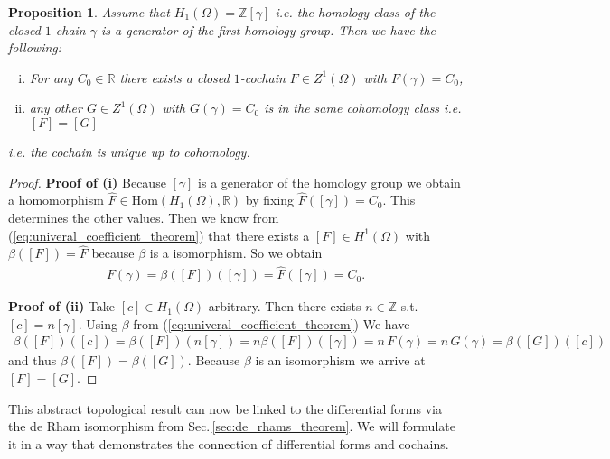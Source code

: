 \documentclass[12pt,a4paper]{article}
\numberwithin{equation}{subsection}
\numberwithin{lemma}{subsection}
\newtheorem{proposition}[lemma]{Proposition}
\theoremstyle{definition}
\newcommand{\integers}{\mathbb{Z}}
\newcommand{\real}{\mathbb{R}}
\begin{document}
\begin{proposition}\label{prop:uniqueness_cochain}
    Assume that $H_1(\Omega) = \integers [\gamma]$ i.e. the homology 
    class of the 
    closed $1$-chain $\gamma$ is a generator of the first homology group.
    Then we have the following:
    \begin{enumerate}[(i)]
        \item For any $C_0 \in \real$ there exists a closed $1$-cochain 
            $F \in Z^1(\Omega)$ with $F(\gamma) = C_0$,
        \item any other $G \in Z^1(\Omega)$ with $G(\gamma) = C_0$ 
            is in the same cohomology class i.e. $[F] = [G]$
    \end{enumerate}
    i.e. the cochain is unique up to cohomology.
\end{proposition}
\begin{proof}
    \textbf{Proof of (i)} %
    Because $[\gamma]$ is a generator of the homology group we  obtain a 
    homomorphism $\hat{F} \in \text{Hom}(H_1(\Omega),\real)$ by fixing
    $\hat{F}([\gamma]) = C_0$. This determines the other values.
    Then we know from (\ref{eq:univeral_coefficient_theorem}) that there exists
    a $[F] \in H^1(\Omega)$ with $\beta([F]) = \hat{F}$ because $\beta$ is a 
    isomorphism. So we obtain
    \begin{align*}
        F(\gamma) = \beta([F])([\gamma]) = \hat{F}([\gamma]) = C_0.
    \end{align*}

    \textbf{Proof of (ii)} %
    Take $[c] \in H_1(\Omega)$ arbitrary. 
    Then there exists  $n \in \integers$ s.t.
    $[c] = n [\gamma]$.
    Using $\beta$ from (\ref{eq:univeral_coefficient_theorem})
    We have
    \begin{align*}
        \beta([F])([c]) = \beta([F])(n [\gamma]) 
        = n \beta([F])([\gamma]) = n \, F(\gamma) = n \, G(\gamma) = 
        \beta([G])([c])
    \end{align*}
    and thus $\beta([F]) = \beta([G])$. Because $\beta$ is an isomorphism
    we arrive at $[F] = [G]$.
\end{proof}
This abstract topological result can now be linked to the differential 
forms via the de Rham isomorphism from Sec.\,\ref{sec:de_rhams_theorem}. 
We will formulate it in a way 
that demonstrates the connection of differential forms and cochains.
\end{document}
